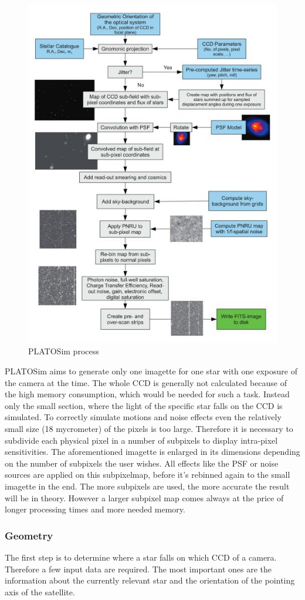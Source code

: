 \begin{figure}[h]
\centering
\includegraphics[width=\textwidth]{PLATOSim_Ablauf.jpg}
\caption{PLATOSim process}
\label{fig:mesh1}
\end{figure}

PLATOSim aims to generate only one imagette for one star with one exposure of the camera at the time. The whole CCD is generally not calculated because of the high memory consumption, which would be needed for such a task. Instead only the small section, where the light of the specific star falls on the CCD is simulated.
\newline
To correctly simulate motions and noise effects even the relatively small size (18 mycrometer) of the pixels is too large. Therefore it is necessary to subdivide each physical pixel in a number of subpixels to display intra-pixel sensitivities. The aforementioned imagette is enlarged in its dimensions depending on the number of subpixels the user wishes. All effects like the PSF or noise sources are applied on this subpixelmap, before it's rebinned again to the small imagette in the end. The more subpixels are used, the more accurate the result will be in theory.  However a larger subpixel map comes always at the price of longer processing times and more needed memory. 

\subsubsection{Geometry}
The first step is to determine where a star falls on which CCD of a camera. Therefore a few input data are required. The most important ones are the information about the currently relevant star and the orientation of the pointing axis of the satellite. 